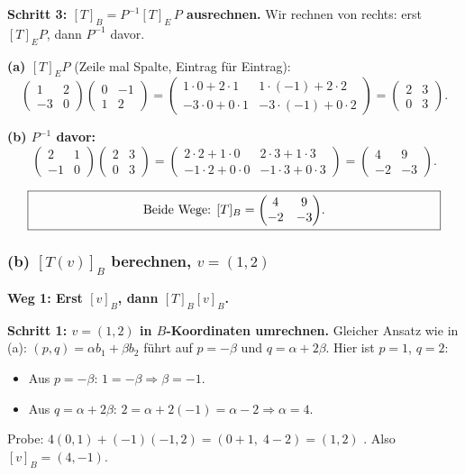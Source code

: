 \documentclass[a4paper,12pt]{article}
\begin{document}
\textbf{Schritt 3: $[T]_B = P^{-1} [T]_E\, P$ ausrechnen.} Wir rechnen von rechts: erst $[T]_E P$, dann $P^{-1}$ davor.

\textbf{(a) $[T]_E P$} (Zeile mal Spalte, Eintrag f\"ur Eintrag):
\[
\begin{pmatrix} 1 & 2 \\ -3 & 0 \end{pmatrix}\begin{pmatrix} 0 & -1 \\ 1 & 2 \end{pmatrix}
= \begin{pmatrix} 1\cdot 0 + 2\cdot 1 & 1\cdot(-1) + 2\cdot 2 \\ -3\cdot 0 + 0\cdot 1 & -3\cdot(-1) + 0\cdot 2 \end{pmatrix}
= \begin{pmatrix} 2 & 3 \\ 0 & 3 \end{pmatrix}.
\]

\textbf{(b) $P^{-1}$ davor:}
\[
\begin{pmatrix} 2 & 1 \\ -1 & 0 \end{pmatrix}\begin{pmatrix} 2 & 3 \\ 0 & 3 \end{pmatrix}
= \begin{pmatrix} 2\cdot 2 + 1\cdot 0 & 2\cdot 3 + 1\cdot 3 \\ -1\cdot 2 + 0\cdot 0 & -1\cdot 3 + 0\cdot 3 \end{pmatrix}
= \begin{pmatrix} 4 & 9 \\ -2 & -3 \end{pmatrix}.
\]

\[
\fbox{\parbox{0.93\textwidth}{\centering
Beide Wege: $[T]_B = \begin{pmatrix} 4 & 9 \\ -2 & -3 \end{pmatrix}$.
}}
\]

\subsubsection*{(b) $[T(v)]_B$ berechnen, $v = (1, 2)$}

\textbf{Weg 1: Erst $[v]_B$, dann $[T]_B [v]_B$.}

\textbf{Schritt 1: $v = (1,2)$ in $B$-Koordinaten umrechnen.} Gleicher Ansatz wie in (a): $(p,q) = \alpha b_1 + \beta b_2$ f\"uhrt auf $p = -\beta$ und $q = \alpha + 2\beta$. Hier ist $p = 1$, $q = 2$:
\begin{itemize}[leftmargin=*, nosep]
    \item Aus $p = -\beta$: \; $1 = -\beta \Rightarrow \beta = -1$.
    \item Aus $q = \alpha + 2\beta$: \; $2 = \alpha + 2(-1) = \alpha - 2 \Rightarrow \alpha = 4$.
\end{itemize}
Probe: $4(0,1) + (-1)(-1,2) = (0+1,\; 4-2) = (1, 2)$ \checkmark. \quad Also $[v]_B = (4, -1)$.
\end{document}
